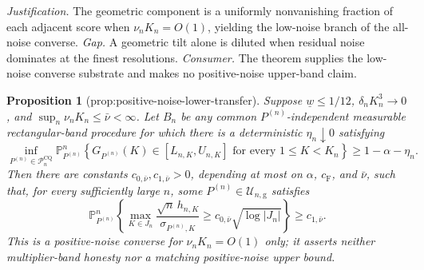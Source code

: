 \documentclass{article}
\newtheorem{proposition}{Proposition}
\begin{document}
\par\smallskip\noindent \textit{Justification.} The geometric component is a uniformly nonvanishing fraction of each adjacent score when \(\nu_nK_n=O(1)\), yielding the low-noise branch of the all-noise converse. \textit{Gap.} A geometric tilt alone is diluted when residual noise dominates at the finest resolutions. \textit{Consumer.} The theorem supplies the low-noise converse substrate and makes no positive-noise upper-band claim.

\begin{proposition}[prop:positive-noise-lower-transfer]\label{prop:positive-noise-lower-transfer}
Suppose \(\underline w\leq1/12\), \(\delta_nK_n^3\to0\), and \(\sup_n\nu_nK_n\leq\bar\nu<\infty\).  Let \(B_n\) be any common \(P^{(n)}\)-independent measurable rectangular-band procedure for which there is a deterministic \(\eta_n\downarrow0\) satisfying
\[
 \inf_{P^{(n)}\in\mathcal P_n^{\mathrm{CQ}}}
 \mathbb P_{P^{(n)}}^n\!\left\{
 G_{P^{(n)}}(K)\in[L_{n,K},U_{n,K}]
 \text{ for every }1\leq K<K_n\right\}
 \geq1-\alpha-\eta_n.
\]
Then there are constants \(c_{0,\bar\nu},c_{1,\bar\nu}>0\), depending at most on \(\alpha\), \(c_{\mathrm F}\), and \(\bar\nu\), such that, for every sufficiently large \(n\), some \(P^{(n)}\in\mathcal U_{n,\mathrm g}\) satisfies
\[
 \mathbb P_{P^{(n)}}^n\!\left\{
 \max_{K\in J_n}\frac{\sqrt n\,h_{n,K}}{\sigma_{P^{(n)},K}}
 \geq c_{0,\bar\nu}\sqrt{\log|J_n|}\right\}\geq c_{1,\bar\nu}.
\]
This is a positive-noise converse for \(\nu_nK_n=O(1)\) only; it asserts neither multiplier-band honesty nor a matching positive-noise upper bound.
\end{proposition}
\end{document}
